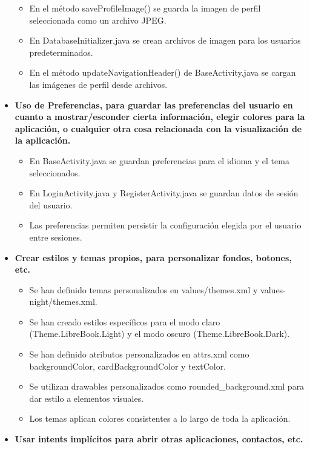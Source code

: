 \documentclass[a4paper,10pt]{report}
\begin{document}
\begin{itemize}
\begin{itemize}
          \item En el método saveProfileImage() se guarda la imagen de perfil seleccionada como un archivo JPEG.
          \item En DatabaseInitializer.java se crean archivos de imagen para los usuarios predeterminados.
          \item En el método updateNavigationHeader() de BaseActivity.java se cargan las imágenes de perfil desde archivos.
        \end{itemize}
        \item \textbf{Uso de Preferencias, para guardar las preferencias del usuario en cuanto a mostrar/esconder cierta información, elegir colores para la aplicación, o cualquier otra cosa relacionada con la visualización de la aplicación.}
        \begin{itemize}
          \item En BaseActivity.java se guardan preferencias para el idioma y el tema seleccionados.
          \item En LoginActivity.java y RegisterActivity.java se guardan datos de sesión del usuario.
          \item Las preferencias permiten persistir la configuración elegida por el usuario entre sesiones.
        \end{itemize}
        \item \textbf{Crear estilos y temas propios, para personalizar fondos, botones, etc.}
        \begin{itemize}
          \item Se han definido temas personalizados en values/themes.xml y values-night/themes.xml\cite{androidUIUX}.
          \item Se han creado estilos específicos para el modo claro (Theme.LibreBook.Light) y el modo oscuro (Theme.LibreBook.Dark).
          \item Se han definido atributos personalizados en attrs.xml como backgroundColor, cardBackgroundColor y textColor.
          \item Se utilizan drawables personalizados como rounded\_background.xml para dar estilo a elementos visuales.
          \item Los temas aplican colores consistentes a lo largo de toda la aplicación.
        \end{itemize}
        \item \textbf{Usar intents implícitos para abrir otras aplicaciones, contactos, etc.}
        \begin{itemize}

\end{itemize}
\end{itemize}
\end{document}
